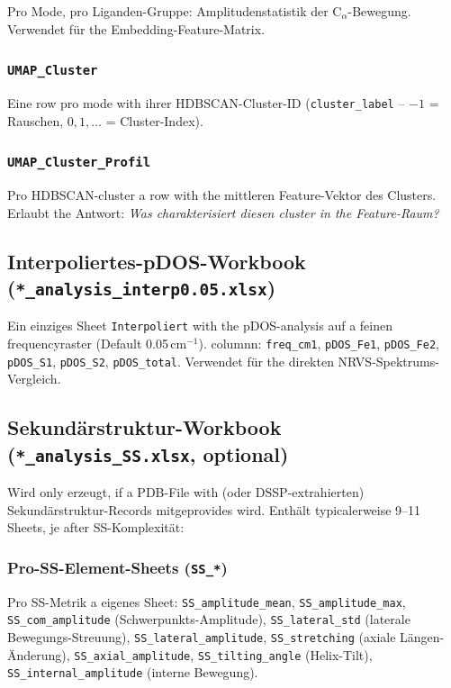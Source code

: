 \documentclass[11pt,a4paper,twoside]{article}
\theoremstyle{remark}
\begin{document}
Pro Mode, pro Liganden-Gruppe: Amplitudenstatistik der
C$_\alpha$-Bewegung. Verwendet f\"ur the Embedding-Feature-Matrix.

\subsubsection*{\texttt{UMAP\_Cluster}}

Eine row pro mode with ihrer HDBSCAN-Cluster-ID
(\texttt{cluster\_label} -- $-1$ = Rauschen, $0, 1, \ldots$ =
Cluster-Index).

\subsubsection*{\texttt{UMAP\_Cluster\_Profil}}

Pro HDBSCAN-cluster a row with the mittleren Feature-Vektor
des Clusters. Erlaubt the Antwort: \emph{Was charakterisiert
diesen cluster in the Feature-Raum?}

\subsection{Interpoliertes-pDOS-Workbook
            (\texttt{*\_analysis\_interp0.05.xlsx})}
\label{app:wb-interp}

Ein einziges Sheet \texttt{Interpoliert} with the pDOS-analysis
auf a feinen frequencyraster (Default 0.05\,cm$^{-1}$). columnn:
\texttt{freq\_cm1}, \texttt{pDOS\_Fe1}, \texttt{pDOS\_Fe2},
\texttt{pDOS\_S1}, \texttt{pDOS\_S2}, \texttt{pDOS\_total}.
Verwendet f\"ur the direkten NRVS-Spektrums-Vergleich.

\subsection{Sekund\"arstruktur-Workbook
            (\texttt{*\_analysis\_SS.xlsx}, optional)}
\label{app:wb-ss}

Wird only erzeugt, if a PDB-File with (oder DSSP-extrahierten)
Sekund\"arstruktur-Records mitgeprovides wird. Enth\"alt typicalerweise
9--11 Sheets, je after SS-Komplexit\"at:

\subsubsection*{Pro-SS-Element-Sheets (\texttt{SS\_*})}

Pro SS-Metrik a eigenes Sheet:
\texttt{SS\_amplitude\_mean},
\texttt{SS\_amplitude\_max},
\texttt{SS\_com\_amplitude} (Schwerpunkts-Amplitude),
\texttt{SS\_lateral\_std} (laterale Bewegungs-Streuung),
\texttt{SS\_lateral\_amplitude},
\texttt{SS\_stretching} (axiale L\"angen-\"Anderung),
\texttt{SS\_axial\_amplitude},
\texttt{SS\_tilting\_angle} (Helix-Tilt),
\texttt{SS\_internal\_amplitude} (interne Bewegung).
\end{document}
